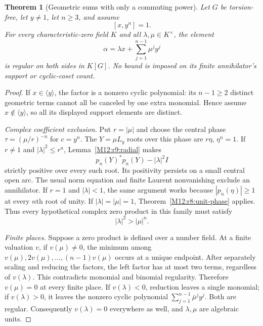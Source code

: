\documentclass[11pt,a4paper,oneside]{report}
\newtheorem{theorem}{Theorem}[section]
\theoremstyle{definition}
\theoremstyle{remark}
\begin{document}
\begin{theorem}[Geometric sums with only a commuting power]
\label{M12:r9:main}
Let $G$ be torsion-free, let $y\ne1$, let $n\ge3$, and assume
\[
 [x,y^n]=1.
\]
For every characteristic-zero field $K$ and all $\lambda,\mu\in K^\times$,
the element
\begin{equation}\label{M12:r9:family}
 \alpha=\lambda x+\sum_{j=1}^{n-1}\mu^j y^j
\end{equation}
is regular on both sides in $K[G]$. No bound is imposed on its
finite annihilator's support or cyclic-coset count.
\end{theorem}

\begin{proof}
If $x\in\langle y\rangle$, the factor is a nonzero cyclic
polynomial: its $n-1\ge2$ distinct geometric terms cannot all
be canceled by one extra monomial. Hence assume
$x\notin\langle y\rangle$, so all its displayed support elements
are distinct.

\emph{Complex coefficient exclusion.}
Put $r=|\mu|$ and choose the central phase
$\tau=(\mu/r)^{-n}$ for $c=y^n$. The $Y=\mu L_y$ roots
over this phase are $r\eta$, $\eta^n=1$.
If $r\ne1$ and $|\lambda|^2\le r^n$,
Lemma~\ref{M12:r9:radial} makes
\[
 p_n(Y)^*p_n(Y)-|\lambda|^2I
\]
strictly positive over every such root. Its positivity persists
on a small central open arc. The usual norm equation and finite
Laurent nonvanishing exclude an annihilator.
If $r=1$ and $|\lambda|<1$, the same argument works because
$|p_n(\eta)|\ge1$ at every $n$th root of unity.
If $|\lambda|=|\mu|=1$, Theorem~\ref{M12:r8:unit-phase} applies.
Thus every hypothetical complex zero product in this family
must satisfy
\begin{equation}\label{M12:r9:necessary}
 |\lambda|^2>|\mu|^n.
\end{equation}

\emph{Finite places.}
Suppose a zero product is defined over a number field.
At a finite valuation $v$, if $v(\mu)\ne0$, the minimum among
$v(\mu),2v(\mu),\ldots,(n-1)v(\mu)$ occurs at a unique endpoint.
After separately scaling and reducing the factors, the left factor
has at most two terms, regardless of $v(\lambda)$.
This contradicts monomial and binomial regularity.
Therefore $v(\mu)=0$ at every finite place.
If $v(\lambda)<0$, reduction leaves a single monomial;
if $v(\lambda)>0$, it leaves the nonzero cyclic polynomial
$\sum_{j=1}^{n-1}\bar\mu^j y^j$. Both are regular.
Consequently $v(\lambda)=0$ everywhere as well, and
$\lambda,\mu$ are algebraic units.


\end{proof}
\end{document}
